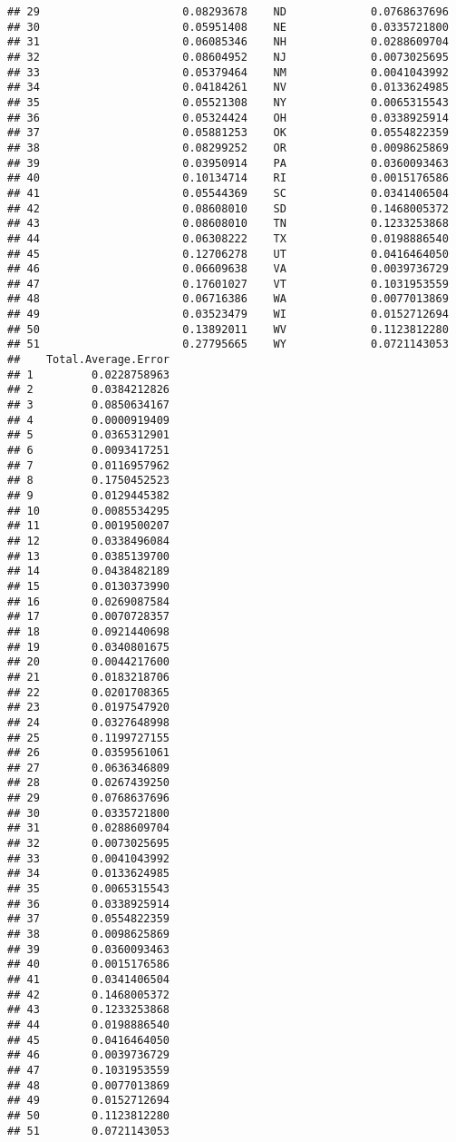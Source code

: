 \documentclass{article}\usepackage[]{graphicx}\usepackage[]{color}
\makeatletter
\newenvironment{kframe}{%
 \def\at@end@of@kframe{}%
 \ifinner\ifhmode%
  \def\at@end@of@kframe{\end{minipage}}%
  \begin{minipage}{\columnwidth}%
 \fi\fi%
 \def\FrameCommand##1{\hskip\@totalleftmargin \hskip-\fboxsep
 \colorbox{shadecolor}{##1}\hskip-\fboxsep
     \hskip-\linewidth \hskip-\@totalleftmargin \hskip\columnwidth}%
 \MakeFramed {\advance\hsize-\width
   \@totalleftmargin\z@ \linewidth\hsize
   \@setminipage}}%
 {\par\unskip\endMakeFramed%
 \at@end@of@kframe}
\newenvironment{knitrout}{}{} %
\makeatother
\begin{document}
\begin{knitrout}
\begin{kframe}
\begin{verbatim}
## 29                      0.08293678    ND             0.0768637696
## 30                      0.05951408    NE             0.0335721800
## 31                      0.06085346    NH             0.0288609704
## 32                      0.08604952    NJ             0.0073025695
## 33                      0.05379464    NM             0.0041043992
## 34                      0.04184261    NV             0.0133624985
## 35                      0.05521308    NY             0.0065315543
## 36                      0.05324424    OH             0.0338925914
## 37                      0.05881253    OK             0.0554822359
## 38                      0.08299252    OR             0.0098625869
## 39                      0.03950914    PA             0.0360093463
## 40                      0.10134714    RI             0.0015176586
## 41                      0.05544369    SC             0.0341406504
## 42                      0.08608010    SD             0.1468005372
## 43                      0.08608010    TN             0.1233253868
## 44                      0.06308222    TX             0.0198886540
## 45                      0.12706278    UT             0.0416464050
## 46                      0.06609638    VA             0.0039736729
## 47                      0.17601027    VT             0.1031953559
## 48                      0.06716386    WA             0.0077013869
## 49                      0.03523479    WI             0.0152712694
## 50                      0.13892011    WV             0.1123812280
## 51                      0.27795665    WY             0.0721143053
##    Total.Average.Error
## 1         0.0228758963
## 2         0.0384212826
## 3         0.0850634167
## 4         0.0000919409
## 5         0.0365312901
## 6         0.0093417251
## 7         0.0116957962
## 8         0.1750452523
## 9         0.0129445382
## 10        0.0085534295
## 11        0.0019500207
## 12        0.0338496084
## 13        0.0385139700
## 14        0.0438482189
## 15        0.0130373990
## 16        0.0269087584
## 17        0.0070728357
## 18        0.0921440698
## 19        0.0340801675
## 20        0.0044217600
## 21        0.0183218706
## 22        0.0201708365
## 23        0.0197547920
## 24        0.0327648998
## 25        0.1199727155
## 26        0.0359561061
## 27        0.0636346809
## 28        0.0267439250
## 29        0.0768637696
## 30        0.0335721800
## 31        0.0288609704
## 32        0.0073025695
## 33        0.0041043992
## 34        0.0133624985
## 35        0.0065315543
## 36        0.0338925914
## 37        0.0554822359
## 38        0.0098625869
## 39        0.0360093463
## 40        0.0015176586
## 41        0.0341406504
## 42        0.1468005372
## 43        0.1233253868
## 44        0.0198886540
## 45        0.0416464050
## 46        0.0039736729
## 47        0.1031953559
## 48        0.0077013869
## 49        0.0152712694
## 50        0.1123812280
## 51        0.0721143053
\end{verbatim}
\end{kframe}
\end{knitrout}
\end{document}
